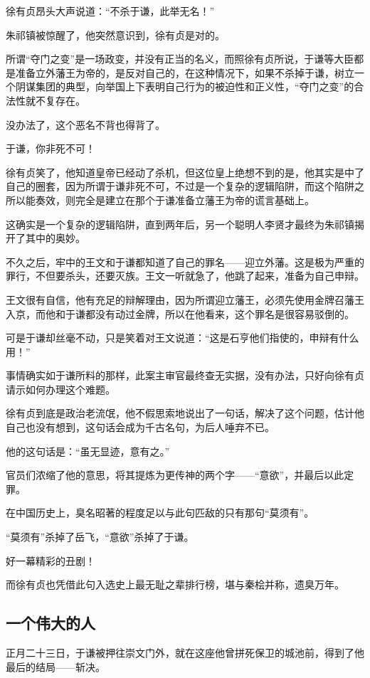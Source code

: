 \begin{multicols}{\theparacolNo}
		徐有贞昂头大声说道：“不杀于谦，此举无名！”

		朱祁镇被惊醒了，他突然意识到，徐有贞是对的。

		所谓“夺门之变”是一场政变，并没有正当的名义，而照徐有贞所说，于谦等大臣都是准备立外藩王为帝的，是反对自己的，在这种情况下，如果不杀掉于谦，树立一个阴谋集团的典型，向举国上下表明自己行为的被迫性和正义性，“夺门之变”的合法性就不复存在。

		没办法了，这个恶名不背也得背了。

		于谦，你非死不可！

		徐有贞笑了，他知道皇帝已经动了杀机，但这位皇上绝想不到的是，他其实是中了自己的圈套，因为所谓于谦非死不可，不过是一个复杂的逻辑陷阱，而这个陷阱之所以能奏效，则完全是建立在那个于谦准备立藩王为帝的谎言基础上。

		这确实是一个复杂的逻辑陷阱，直到两年后，另一个聪明人李贤才最终为朱祁镇揭开了其中的奥妙。

		不久之后，牢中的王文和于谦都知道了自己的罪名——迎立外藩。这是极为严重的罪行，不但要杀头，还要灭族。王文一听就急了，他跳了起来，准备为自己申辩。

		王文很有自信，他有充足的辩解理由，因为所谓迎立藩王，必须先使用金牌召藩王入京，而他和于谦都没有动过金牌，所以在他看来，这个罪名是很容易驳倒的。

		可是于谦却丝毫不动，只是笑着对王文说道：“这是石亨他们指使的，申辩有什么用！”

		事情确实如于谦所料的那样，此案主审官最终查无实据，没有办法，只好向徐有贞请示如何办理这个难题。

		徐有贞到底是政治老流氓，他不假思索地说出了一句话，解决了这个问题，估计他自己也没有想到，这句话会成为千古名句，为后人唾弃不已。

		他的这句话是：“虽无显迹，意有之。”

		官员们浓缩了他的意思，将其提炼为更传神的两个字——“意欲”，并最后以此定罪。

		在中国历史上，臭名昭著的程度足以与此句匹敌的只有那句“莫须有”。

		“莫须有”杀掉了岳飞，“意欲”杀掉了于谦。

		好一幕精彩的丑剧！

		而徐有贞也凭借此句入选史上最无耻之辈排行榜，堪与秦桧并称，遗臭万年。

		\subsection{一个伟大的人}
		正月二十三日，于谦被押往崇文门外，就在这座他曾拼死保卫的城池前，得到了他最后的结局——斩决。


\end{multicols}
